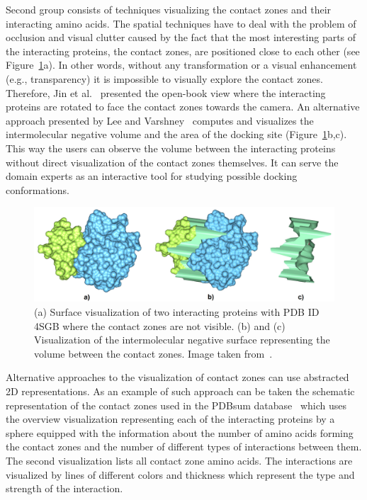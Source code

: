 \documentclass[journal]{vgtc}                %
\begin{document}
Second group consists of techniques visualizing the contact zones and their interacting amino acids.
The spatial techniques have to deal with the problem of occlusion and visual clutter caused by the fact that the most interesting parts of the interacting proteins, the contact zones, are positioned close to each other (see Figure~\ref{fig:varshney}a).
In other words, without any transformation or a visual enhancement (e.g., transparency) it is impossible to visually explore the contact zones.
Therefore, Jin et al.~\cite{Jin2014} presented the open-book view where the interacting proteins are rotated to face the contact zones towards the camera.
An alternative approach presented by Lee and Varshney~\cite{Varshney2003} computes and visualizes the intermolecular negative volume and the area of the docking site (Figure~\ref{fig:varshney}b,c).
This way the users can observe the volume between the interacting proteins without direct visualization of the contact zones themselves.
It can serve the domain experts as an interactive tool for studying possible docking conformations.

\begin{figure}[tb]
  \centering
  \includegraphics[width=1.0\columnwidth]{varshney.png}
  \caption{(a) Surface visualization of two interacting proteins with PDB ID 4SGB where the contact zones are not visible. (b) and (c) Visualization of the intermolecular negative surface representing the volume between the contact zones. Image taken from~\cite{Varshney2003}.}
  \label{fig:varshney}
\end{figure}

Alternative approaches to the visualization of contact zones can use abstracted 2D representations.
As an example of such approach can be taken the schematic representation of the contact zones used in the PDBsum database~\cite{pdbsum} which uses the overview visualization representing each of the interacting proteins by a sphere equipped with the information about the number of amino acids forming the contact zones and the number of different types of interactions between them.
The second visualization lists all contact zone amino acids. 
The interactions are visualized by lines of different colors and thickness which represent the type and strength of the interaction.
\end{document}
